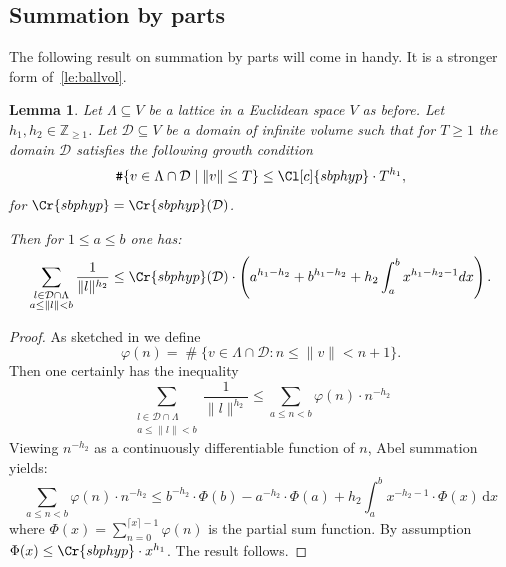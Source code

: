 \documentclass{amsart}
\newtheorem{lemma}[theorem]{Lemma}
\theoremstyle{definition}
\theoremstyle{remark}
\newcommand{\diff}{\,\mathrm{d}}
\DeclareMathOperator{\card}{\texttt{\#}}
\begin{document}
\subsection{Summation by parts}

The following result on summation by parts will come in handy. It is a stronger form of~\cref{le:ballvol}.
\begin{lemma}
    \label{le:domain_dimension_bound}
    Let $\Lambda \subseteq V$ be a lattice in a Euclidean space $V$ as before.
    Let $h_1,h_2 \in \mathbb{Z}_{\geq 1}$. 
    Let $\mathcal{D} \subseteq V$ be a domain of infinite volume such that for $T \geq 1$ the domain $\mathcal{D}$ satisfies the following growth condition
    \begin{equation}
        \card\{v \in \Lambda  \cap \mathcal{D} \mid 
            \|v\| \leq T
        \}
        \leq 
        \Cl[c]{sbphyp}
        \cdot T^{h_1},
    \end{equation}
    for $\Cr{sbphyp} = \Cr{sbphyp}(\mathcal{D})$.

    Then for $1 \leq a \leq b$ one has:
    \begin{equation}
        \sum_{\substack{ l \in  \mathcal{D} \cap \Lambda  \\   a \leq \|l\| < b}} \frac{1}{\|l\|^{h_2}} 
        \leq \Cr{sbphyp}(\mathcal{D})\cdot
        \left( a^{h_1-h_2} + b^{h_1-h_2} + h_{2} \int_{a}^{b} x^{h_1 - h_2 -1} dx \right).
    \end{equation}
\end{lemma}
\begin{proof}
    As sketched in \cite[(13)]{K1994} we define 
    \begin{equation}
        \varphi(n) = \card \{ v \in \Lambda \cap \mathcal{D} : n\leq  \|v\| < n+1\}.
    \end{equation}
    Then one certainly has the inequality
    \begin{equation}
        \sum_{\substack{ l \in  \mathcal{D} \cap \Lambda  \\   a \leq \|l\| < b}} \frac{1}{\|l\|^{h_2}} 
 \leq \sum_{a\leq n<b}\varphi(n)\cdot n^{-h_2}
    \end{equation}
    Viewing $n^{-h_2}$ as a continuously differentiable function of $n$, Abel summation yields: 
    \begin{equation}
         \sum_{a\leq n< b}\varphi(n)\cdot n^{-h_2}\leq b^{-h_2}\cdot \Phi(b)- a^{-h_2}\cdot\Phi(a)+ h_2 \int_{a}^{b} x^{-h_{2}-1}\cdot\Phi(x) \diff x
    \end{equation}
    where $\Phi(x)=\sum_{n=0}^{\lceil x\rceil-1}\varphi(n)$ is the partial sum function. By assumption $\Phi(x)\leq\Cr{sbphyp}\cdot x^{h_1}$. The result follows.
\end{proof}
\end{document}
